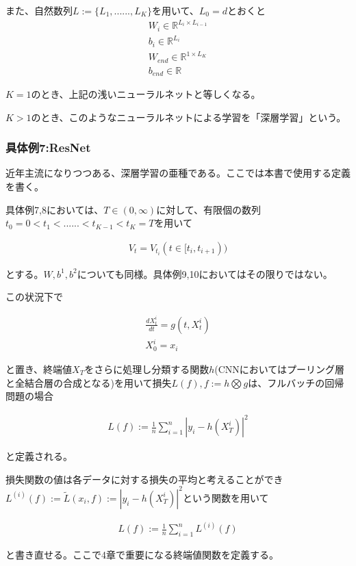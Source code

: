 \documentclass{jsarticle}
\begin{document}
また、自然数列$L:=\{L_1,......,L_K\}$を用いて、$L_0=d$とおくと
\begin{align}
W_i\in \mathbb{R}^{ L_i\times L_{i-1}}\\
b_i\in \mathbb{R}^{L_i}\\
W_{end}\in\mathbb{R}^{1\times L_K}\\
b_{end}\in\mathbb{R}
\end{align}

$K=1$のとき、上記の浅いニューラルネットと等しくなる。

$K>1$のとき、このようなニューラルネットによる学習を「深層学習」という。


\subsubsection{具体例7:ResNet}
近年主流になりつつある、深層学習の亜種である。ここでは本書で使用する定義を書く。


具体例7,8においては、$T\in(0,\infty)$に対して、有限個の数列$t_0=0<t_1<......<t_{K-1}<t_K=T$を用いて

\begin{align}
V_t=V_{t_i} (t\in[t_i,t_{i+1}))
\end{align}

とする。$W,b^1,b^2$についても同様。具体例9,10においてはその限りではない。

この状況下で

\begin{align}
\frac{dX^i_t}{dt}=g(t,X^i_t)\\
X^i_0=x_i
\end{align}

と置き、終端値$X_T$をさらに処理し分類する関数$h$(CNNにおいてはプーリング層と全結合層の合成となる)を用いて損失$L(f),f:=h\bigotimes g$は、フルバッチの回帰問題の場合

\begin{align}
L(f):=\frac{1}{n}\sum^n_{i=1}|y_i-h(X^i_T)|^2
\end{align}

と定義される。

損失関数の値は各データに対する損失の平均と考えることができ$L^{(i)}(f):=\tilde{L}(x_i,f):=|y_i-h(X^i_T)|^2$という関数を用いて

\begin{align}
L(f):=\frac{1}{n}\sum^n_{i=1} L^{(i)}(f)
\end{align}

と書き直せる。ここで4章で重要になる終端値関数を定義する。
\end{document}
